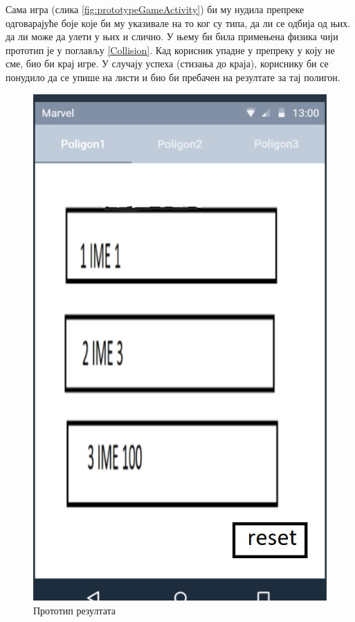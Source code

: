 Сама игра (слика \ref{fig:prototypeGameActivity}) би му нудила препреке одговарајуће боје које би му указивале на то ког су типа, да ли се одбија од њих. да ли може да улети у њих и слично. У њему би била примењена физика чији прототип је у поглављу \ref{Collision}. Кад корисник упадне у препреку у коју не сме, био би крај игре. У случају успеха (стизања до краја), кориснику би се понудило да се упише на листи и био би пребачен на резултате за тај  полигон. 

\begin{figure}[htb!]
\begin{center}
\includegraphics[scale=.5]{pictures/prototype/resultsActivity}
\caption{Прототип резултата}\label{fig:prototypeResults}
\end{center}
\end{figure}

